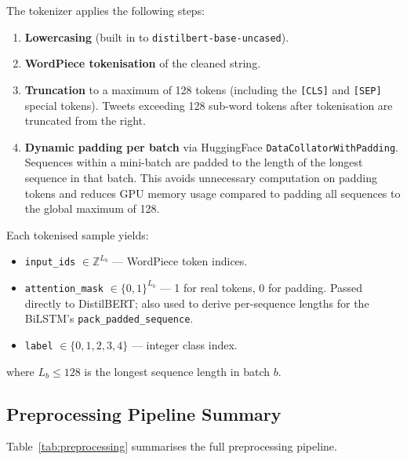 The tokenizer applies the following steps:
\begin{enumerate}
    \item \textbf{Lowercasing} (built in to \texttt{distilbert-base-uncased}).
    \item \textbf{WordPiece tokenisation} of the cleaned string.
    \item \textbf{Truncation} to a maximum of 128 tokens (including the \texttt{[CLS]} and \texttt{[SEP]} special tokens). Tweets exceeding 128 sub-word tokens after tokenisation are truncated from the right.
    \item \textbf{Dynamic padding per batch} via HuggingFace \texttt{DataCollatorWithPadding}. Sequences within a mini-batch are padded to the length of the longest sequence in that batch. This avoids unnecessary computation on padding tokens and reduces GPU memory usage compared to padding all sequences to the global maximum of 128.
\end{enumerate}

Each tokenised sample yields:
\begin{itemize}
    \item \texttt{input\_ids} $\in \mathbb{Z}^{L_b}$ — WordPiece token indices.
    \item \texttt{attention\_mask} $\in \{0,1\}^{L_b}$ — 1 for real tokens, 0 for padding. Passed directly to DistilBERT; also used to derive per-sequence lengths for the BiLSTM's \texttt{pack\_padded\_sequence}.
    \item \texttt{label} $\in \{0,1,2,3,4\}$ — integer class index.
\end{itemize}

where $L_b \leq 128$ is the longest sequence length in batch $b$.

\subsection{Preprocessing Pipeline Summary}

Table~\ref{tab:preprocessing} summarises the full preprocessing pipeline.

